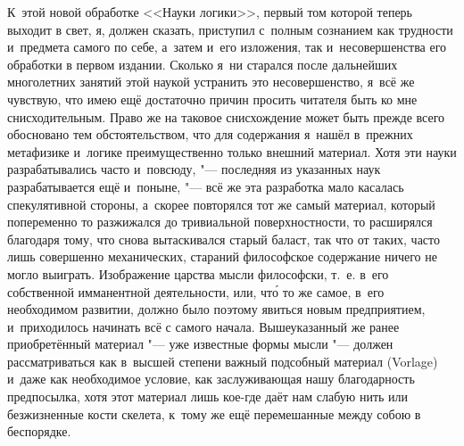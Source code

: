 К~этой новой обработке <<Науки логики>>, первый том которой теперь выходит в
свет, я, должен сказать, приступил с~полным сознанием как трудности и~предмета
самого по себе, а~затем и~его изложения, так и~несовершенства его обработки в
первом издании. Сколько я~ни старался после дальнейших многолетних занятий этой
наукой устранить это несовершенство, я~всё же чувствую, что имею ещё достаточно
причин просить читателя быть ко мне снисходительным. Право же на таковое
снисхождение может быть прежде всего обосновано тем обстоятельством, что для
содержания я~нашёл в~прежних метафизике и~логике преимущественно только внешний
материал. Хотя эти науки разрабатывались часто и~повсюду, "--- последняя из
указанных наук разрабатывается ещё и~поныне, "--- всё же эта разработка мало
касалась спекулятивной стороны, а~скорее повторялся тот же самый материал,
который попеременно то разжижался до тривиальной поверхностности, то расширялся
благодаря тому, что снова вытаскивался старый баласт, так что от таких, часто
лишь совершенно механических, стараний философское содержание ничего не могло
выиграть. Изображение царства мысли философски, т.~е. в~его собственной
имманентной деятельности, или, чт\'{о} то же самое, в~его необходимом развитии,
должно было поэтому явиться новым предприятием, и~приходилось начинать всё с
самого начала. Вышеуказанный же ранее приобретённый материал "--- уже известные
формы мысли "--- должен рассматриваться как в~высшей степени важный подсобный
материал (Vorlage) и~даже как необходимое условие, как заслуживающая нашу
благодарность предпосылка, хотя этот материал лишь кое-где даёт нам слабую нить
или безжизненные кости скелета, к~тому же ещё перемешанные между собою в
беспорядке.


